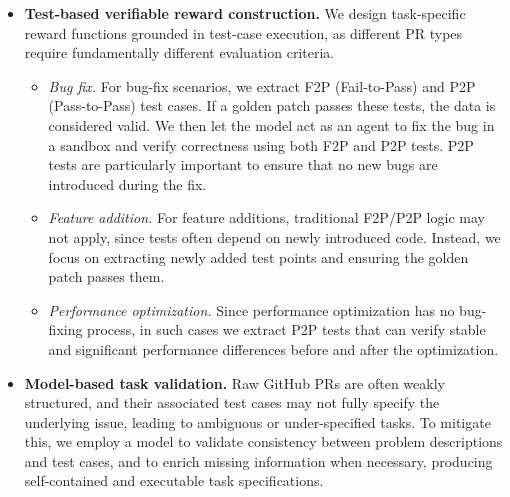 \begin{itemize}
    \item \textbf{Test-based verifiable reward construction.} We design task-specific reward functions grounded in test-case execution, as different PR types require fundamentally different evaluation criteria.

    \begin{itemize}
        \item \textit{Bug fix.} For bug-fix scenarios, we extract F2P (Fail-to-Pass) and P2P (Pass-to-Pass) test cases. If a golden patch passes these tests, the data is considered valid. We then let the model act as an agent to fix the bug in a sandbox and verify correctness using both F2P and P2P tests. P2P tests are particularly important to ensure that no new bugs are introduced during the fix.
        
        \item \textit{Feature addition.} For feature additions, traditional F2P/P2P logic may not apply, since tests often depend on newly introduced code. Instead, we focus on extracting newly added test points and ensuring the golden patch passes them.
        
        \item \textit{Performance optimization.} Since performance optimization has no bug-fixing process, in such cases we extract P2P tests that can verify stable and significant performance differences before and after the optimization.
    \end{itemize}


    \item \textbf{Model-based task validation.} Raw GitHub PRs are often weakly structured, and their associated test cases may not fully specify the underlying issue, leading to ambiguous or under-specified tasks. To mitigate this, we employ a model to validate consistency between problem descriptions and test cases, and to enrich missing information when necessary, producing self-contained and executable task specifications.



\end{itemize}
